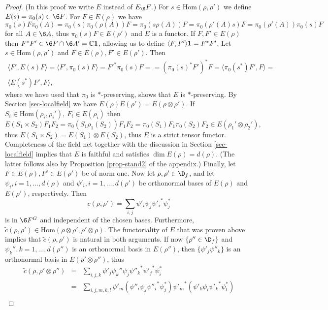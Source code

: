 \documentclass[11pt]{article}
\theoremstyle{definition}
\theoremstyle{definition}
\theoremstyle{remark}
\def\7#1{{\mathbb #1}}
\def\1#1{{\bf #1}}
\newcommand{\Hom}{\mathrm{Hom}}
\begin{document}
\begin{proof} (In this proof we write $E$ instead of $E_\6F$.) For $s\in\Hom(\rho,\rho')$ we define
$E(s)=\pi_0(s)\in\6F$. For $F\in E(\rho)$ we have  
$\pi_0(s)F\pi_0(A)=\pi_0(s)\pi_0(\rho(A))F=\pi_0(s\rho(A))F=\pi_0(\rho'(A)s)F=\pi_0(\rho'(A))\pi_0(s)F$
for all $A\in\6A$, thus $\pi_0(s)F\in E(\rho')$ and $E$ is a functor. If $F,F'\in E(\rho)$ then
$F^*F'\in\6F\cap\6A'=\7C\11$, allowing us to define $\langle F,F'\rangle\11=F^*F'$.
Let $s\in\Hom(\rho,\rho')$ and $F\in E(\rho),F'\in E(\rho')$. Then 
\begin{multline*}
 \langle F',E(s)F\rangle=\langle F',\pi_0(s)F\rangle={F'}^*\pi_0(s)F=
  =(\pi_0(s)^*F')^*F =\langle\pi_0(s^*)F',F\rangle= \\
  \langle E(s^*)F',F\rangle,
\end{multline*}
where we have used that $\pi_0$ is $*$-preserving, shows that $E$ is $*$-preserving.
By Section \ref{sec-localfield} we have $E(\rho)E(\rho')=E(\rho\otimes\rho')$. If
$S_i\in\Hom(\rho_i,\rho_i'), \ F_i\in E(\rho_i)$ then 
\[ E(S_1\times
S_2)F_1F_2=\pi_0(S_1\rho_1(S_2))F_1F_2=\pi_0(S_1)F_1\pi_0(S_2)F_2
\in E(\rho_1'\otimes\rho_2'), \] thus $E(S_1\times
S_2)=E(S_1)\otimes E(S_2)$, thus $E$ is a strict tensor
functor.  Completeness of the field net together with
the discussion in Section \ref{sec-localfield} implies
that $E$ is faithful and satisfies $\dim
E(\rho)=d(\rho)$. (The latter follows also by
Proposition \ref{prop-stand2} of the appendix.)
Finally, let $F\in E(\rho), F'\in E(\rho')$ be of norm
one. Now let $\rho,\rho'\in\D_f$, and let $\psi_i,
i=1,\ldots,d(\rho)$ and $\psi'_i, i=1,\ldots,d(\rho')$
be orthonormal bases of $E(\rho)$ and $E(\rho')$,
respectively. Then
\[ \tilde{c}(\rho,\rho')=\sum_{i,j}\psi'_i\psi_j{\psi'_i}^*\psi_j^* \]
is in $\6F^G$ and independent of the chosen bases. Furthermore,
$\tilde{c}(\rho,\rho')\in\Hom(\rho\otimes\rho',\rho'\otimes\rho)$. The functoriality of $E$ that was
proven above implies that $\tilde{c}(\rho,\rho')$ is natural in both arguments. If now
$\{\rho''\in\D_f\}$ and $\psi_k'', k=1,\ldots,d(\rho'')$ is an orthonormal basis in $E(\rho'')$,
then $\{\psi'_j\psi''_k\}$ is an orthonormal  basis in $E(\rho'\otimes\rho'')$, thus 
\begin{eqnarray*}
  \tilde{c}(\rho,\rho'\otimes\rho'')&=&
\sum_{i,j,k}\psi'_j\psi_k''\psi_j{\psi''_k}^*{\psi'_j}^*\psi_i^* \\
  &=&\sum_{i,j,m,k,l} \psi'_m (\psi''_i\psi_j{\psi''_i}^*\psi_j^*) {\psi'_m}^*
    (\psi'_k\psi_l{\psi'_k}^*\psi_l^*) \\

\end{eqnarray*}
\end{proof}
\end{document}
